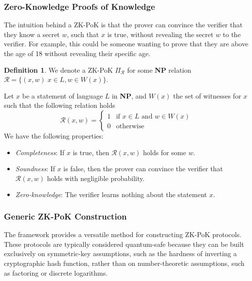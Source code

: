 \documentclass[11pt]{report}
\theoremstyle{definition}
\newtheorem{definition}{Definition}[section]
\theoremstyle{plain}
\begin{document}
\subsubsection{Zero-Knowledge Proofs of Knowledge}\label{sec:zk}
The intuition behind a ZK-PoK is that the prover can convince the verifier that they know a secret $w$, such that $x$ is true, without revealing the secret $w$ to the verifier. For example, this could be someone wanting to prove that they are above the age of 18 without revealing their specific age.

\begin{definition}
  We denote a ZK-PoK $\Pi_{\mathcal{R}}$ for some \textbf{NP} relation $\mathcal{R} = \{(x, w)\; x \in L, w \in W(x)\}$.

  Let $x$ be a statement of language $L$ in \textbf{NP}, and $W(x)$ the set of witnesses for $x$ such that the following relation holds~\cite{feneuil2023threshold}   \[
    \mathcal{R}(x,w) = \begin{cases}
                         1 & \text{if } x \in L \text{ and } w \in W(x) \\
                         0 & \text{otherwise}
                       \end{cases}
  \]  We have the following properties:
  \begin{itemize}
    \item \textit{Completeness}: If $x$ is true, then $\mathcal{R}(x, w)$ holds for some $w$.
    \item \textit{Soundness}: If $x$ is false, then the prover can convince the verifier that $\mathcal{R}(x, w)$ holds with negligible probability.
    \item \textit{Zero-knowledge}: The verifier learns nothing about the statement $x$.
  \end{itemize}
\end{definition}

\subsubsection{Generic ZK-PoK Construction}\label{sec:zk-generic}

The framework provides a versatile method for constructing ZK-PoK protocols. These protocols are typically considered quantum-safe because they can be built exclusively on symmetric-key assumptions, such as the hardness of inverting a cryptographic hash function, rather than on number-theoretic assumptions, such as factoring or discrete logarithms.
\end{document}
